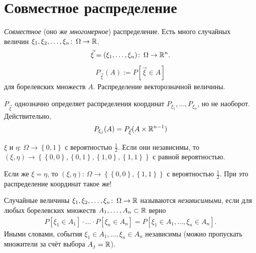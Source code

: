\section{Совместное распределение}

\begin{df}
 \textit{Совместное} (оно же \textit{многомерное}) распределение. Есть много случайных величин $ \xi_1, \xi_2, \ldots, \xi_n \colon\, \Omega\to\mathbb{R} $.
 \begin{align*}
  \vec \xi = (\xi_{1}, \ldots, \xi_n) \colon\,\Omega \to \mathbb{R}^{n}.
 \end{align*}
 \begin{align*}
  P_{\vec\xi}(A) := P[\vec\xi \in A]
 \end{align*} для борелевских множеств $ A $. Распределение векторозначной величины. 
\end{df}
\begin{remrk}
 $ P_{\vec\xi} $ однозначно определяет распределения координат $ P_{\xi_1}, \ldots, P_{\xi_n} $, но не наоборот. Действительно,
 \begin{align*}
  P_{\xi_j}(A) = P_{\vec\xi}(A \times \mathbb{R}^{n-1})
 \end{align*} 
\end{remrk}
\begin{exmpl}
 $ \xi $ и $ \eta \colon\,\Omega \to \left\{ 0,1 \right\}$  с вероятностью $ \frac{1}{2} $. Если они независимы, то $ (\xi,\eta) \to \left\{ \left\{ 0,0 \right\}, \left\{ 0,1 \right\}, \left\{ 1,0 \right\}, \left\{ 1,1 \right\} \right\} $ с равной вероятностью.

 Если же $ \xi = \eta $, то $ (\xi,\eta) \colon\,\Omega \to \left\{ \left\{ 0,0 \right\}, \left\{ 1,1 \right\} \right\} $ с вероятностью $ \frac{1}{2} $. При это распределение координат такое же!
\end{exmpl}

\begin{df}
 Случайные величины $ \xi_1, \xi_2, \ldots, \xi_n \colon\, \Omega \to \mathbb{R} $ называются \textit{независимыми}, если для любых борелевских множеств $ A_1, \ldots, A_n \subset \mathbb{R} $ верно
 \begin{align*}
  P[\xi_1 \in A_1] \cdot \ldots \cdot P[\xi_n \in A_n] = P[\xi_1 \in A_1, \ldots, \xi_n \in A_n].
 \end{align*} Иными словами, события $ \xi_1 \in A_1, \ldots, \xi_n \in A_n $ независимы (можно пропускать множители за счёт выбора $ A_j  = \mathbb{R} $).
\end{df}

